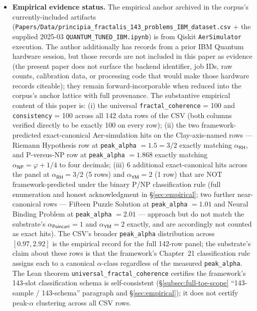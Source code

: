 \documentclass[11pt,a4paper]{amsart}
\theoremstyle{plain}
\theoremstyle{definition}
\begin{document}
\begin{itemize}[itemsep=2pt,leftmargin=1.4em]
substrate) is the structural source of all three matches; the substrate's posture is that the cross-domain agreement under one substrate-rigidity argument is the substrate's distinctive content. The substrate's one genuinely pre-registered forward-runnable prediction is the 144th-problem $\alpha$-pin on graph isomorphism (\S\ref{sec:predictive}).
\item \textbf{Empirical evidence status.} The empirical anchor archived in the corpus's currently-included artifacts (\texttt{Papers/Data/principia\_fractalis\_143\_problems\_IBM\_dataset.csv} + the supplied 2025-03 \texttt{QUANTUM\_TUNED\_IBM.ipynb}) is from Qiskit \texttt{AerSimulator} execution. The author additionally has records from a prior IBM Quantum hardware session, but those records are not included in this paper as evidence (the present paper does not surface the backend identifier, job IDs, raw counts, calibration data, or processing code that would make those hardware records citeable); they remain forward-incorporable when reduced into the corpus's anchor lattice with full provenance. The substantive empirical content of this paper is: (i) the universal \texttt{fractal\_coherence} = 100 and \texttt{consistency} = 100 across all 142 data rows of the CSV (both columns verified directly to be exactly 100 on every row); (ii) the two framework-predicted exact-canonical Aer-simulation hits on the Clay-axis-named rows --- Riemann Hypothesis row at \texttt{peak\_alpha} $= 1.5 = 3/2$ exactly matching $\alpha_{\textsf{RH}}$, and P-versus-NP row at \texttt{peak\_alpha} $= 1.868$ exactly matching $\alpha_{\textsf{NP}} = \varphi + 1/4$ to four decimals; (iii) 6 additional exact-canonical hits across the panel at $\alpha_{\textsf{RH}} = 3/2$ (5 rows) and $\alpha_{\textsf{YM}} = 2$ (1 row) that are NOT framework-predicted under the binary P/NP classification rule (full enumeration and honest acknowledgment in \S\ref{sec:empirical}; two further near-canonical rows --- Fifteen Puzzle Solution at \texttt{peak\_alpha} $= 1.01$ and Neural Binding Problem at \texttt{peak\_alpha} $= 2.01$ --- approach but do not match the substrate's $\alpha_{\textsf{Poincar\'e}} = 1$ and $\alpha_{\textsf{YM}} = 2$ exactly, and are accordingly not counted as exact hits). The CSV's broader \texttt{peak\_alpha} distribution across $[0.97, 2.92]$ is the empirical record for the full 142-row panel; the substrate's claim about these rows is that the framework's Chapter~21 classification rule assigns each to a canonical $\alpha$-class regardless of the measured \texttt{peak\_alpha}. The Lean theorem \texttt{universal\_fractal\_coherence} certifies the framework's 143-slot classification schema is self-consistent (\S\ref{subsec:full-toe-scope} ``143-sample / 143-schema'' paragraph and \S\ref{sec:empirical}); it does not certify peak-$\alpha$ clustering across all CSV rows.

\end{itemize}
\end{document}
